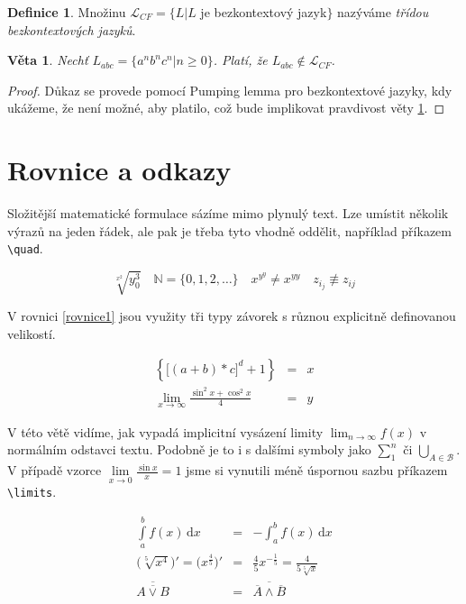 \documentclass[11pt, a4paper, twocolumn]{article}
\theoremstyle{definition}
\newtheorem{definice}{Definice}[section]
\theoremstyle{plain}
\newtheorem{veta}{Věta}
\begin{document}
	\begin{definice}
	Množinu $\mathcal{L}_{CF} = \{L|L$ je bezkontextový jazyk$\}$ nazýváme \emph{třídou bezkontextových jazyků}.
	\end{definice}

	\begin{veta} \label{veta1}
	Nechť $L_{abc} = \{a^n b^n c^n | n \geq 0\}$. Platí, že $L_{abc} \notin \mathcal{L}_{CF}$.
	\end{veta}

	\begin{proof}
	Důkaz se provede pomocí Pumping lemma pro bezkontextové jazyky, kdy ukážeme, že není možné, aby platilo, což bude implikovat pravdivost věty \ref{veta1}.
	\end{proof}

	\section{Rovnice a odkazy}
	Složitější matematické formulace sázíme mimo plynulý text. Lze umístit několik výrazů na jeden řádek, ale pak je třeba tyto vhodně oddělit, například příkazem \verb|\quad|. 

	$$\sqrt[x^2]{y^3_0} \quad \mathbb{N} = \{0,1,2,\ldots\} \quad x^{y^y} \neq x^{yy} \quad z_{i_j} \not\equiv z_{ij}$$

	V rovnici \eqref{rovnice1} jsou využity tři typy závorek s různou explicitně definovanou velikostí.

	\begin{eqnarray} \label{rovnice1}
		\left\{ {\Big[ (a+b)*c \Big]}^d + 1 \right\} & = & x \\
		\lim_{x \to \infty} \frac{\sin^2 x + \cos^2 x}{4} & = & y \nonumber
	\end{eqnarray}

	V této větě vidíme, jak vypadá implicitní vysázení limity $\lim_{n \to \infty} f(x)$ v normálním odstavci textu. Podobně je to i s dalšími symboly jako $\sum_{1}^{n}$ či $\bigcup_{A \in \mathcal{B}}$. V případě vzorce $\lim\limits_{x \to 0} \frac{\sin x}{x} = 1$ jsme si vynutili méně úspornou sazbu příkazem \verb|\limits|.

	\begin{eqnarray}
		\int\limits_{a}^{b} f(x)\,\mathrm{d}x & = & - \int_{a}^{b} f(x)\,\mathrm{d}x \\
		\Big(\sqrt[5]{x^4}\Big)' = \Big(x^{\frac{4}{5}}\Big)' & = & \frac{4}{5}x^{-\frac{1}{5}} = \frac{4}{5 \sqrt[5]{x}} \\
		\overline{\overline{A \vee B}} & = & \overline{\overline{A} \wedge \overline{B}}
	\end{eqnarray}
	
\end{document}
